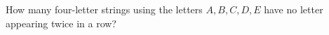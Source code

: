 How many four-letter strings using the letters $A,B,C,D,E$ have no letter appearing twice in a row?
